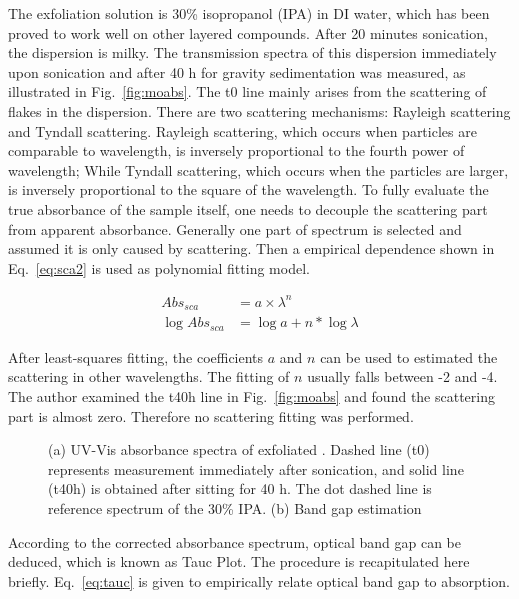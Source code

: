 The exfoliation solution is 30\% isopropanol (IPA) in DI water, which has been proved to work well on other layered compounds.\cite{Halim2013} After 20 minutes sonication, the dispersion is milky. The transmission spectra of this dispersion immediately upon sonication and after 40 h for gravity sedimentation was measured, as illustrated in Fig.~\ref{fig:moabs}. The t0 line mainly arises from the scattering of flakes in the dispersion. There are two scattering mechanisms: Rayleigh scattering and Tyndall scattering. Rayleigh scattering, which occurs when particles are comparable to wavelength, is inversely proportional to the fourth power of wavelength; While Tyndall scattering, which occurs when the particles are larger, is inversely proportional to the square of the wavelength. To fully evaluate the true absorbance of the sample itself, one needs to decouple the scattering part from apparent absorbance. Generally  one part of spectrum is selected and assumed it is only caused by scattering. Then a empirical dependence shown in Eq.~\ref{eq:sca2} is used as polynomial fitting model.

\begin{align}
Abs_{sca}  & = a\times \lambda^{n}  \label{eq:sca1}\\
\log{Abs_{sca}} & = \log{a} + n*\log{\lambda} \label{eq:sca2}
\end{align}

After least-squares fitting, the coefficients $a$ and $n$ can be used to estimated the scattering in other wavelengths. The fitting of $n$ usually falls between -2 and -4. The author examined the t40h line in Fig.~\ref{fig:moabs} and found the scattering part is almost zero. Therefore no scattering fitting was performed.

\begin{figure}[htb]
\centering
{}\hspace{0.04\textwidth}
\caption[UV-Vis spectra of exfoliated ]{(a) UV-Vis absorbance spectra of exfoliated . Dashed line (t0) represents measurement immediately after sonication, and solid line (t40h) is obtained after sitting for 40 h. The dot dashed line is reference spectrum of the 30\% IPA. (b) Band gap estimation}
\label{fig:mouv}
\end{figure}

According to the corrected absorbance spectrum, optical band gap can be deduced, which is known as Tauc Plot.\cite{Tauc1972} The procedure is recapitulated here briefly. Eq.~\ref{eq:tauc} is given to empirically relate optical band gap to absorption.

